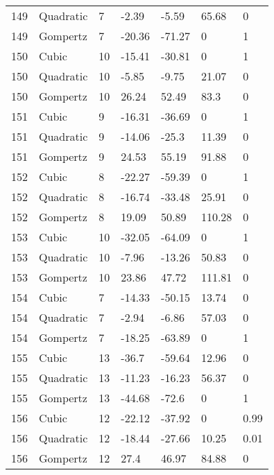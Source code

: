 \documentclass[11pt]{article}
\begin{document}
\begin{center}
\begin{longtable}{lllllll}
    149 & Quadratic & 7               & -2.39   & -5.59   & 65.68   & 0    \\
    149 & Gompertz  & 7               & -20.36  & -71.27  & 0       & 1    \\
    150 & Cubic     & 10              & -15.41  & -30.81  & 0       & 1    \\
    150 & Quadratic & 10              & -5.85   & -9.75   & 21.07   & 0    \\
    150 & Gompertz  & 10              & 26.24   & 52.49   & 83.3    & 0    \\
    151 & Cubic     & 9               & -16.31  & -36.69  & 0       & 1    \\
    151 & Quadratic & 9               & -14.06  & -25.3   & 11.39   & 0    \\
    151 & Gompertz  & 9               & 24.53   & 55.19   & 91.88   & 0    \\
    152 & Cubic     & 8               & -22.27  & -59.39  & 0       & 1    \\
    152 & Quadratic & 8               & -16.74  & -33.48  & 25.91   & 0    \\
    152 & Gompertz  & 8               & 19.09   & 50.89   & 110.28  & 0    \\
    153 & Cubic     & 10              & -32.05  & -64.09  & 0       & 1    \\
    153 & Quadratic & 10              & -7.96   & -13.26  & 50.83   & 0    \\
    153 & Gompertz  & 10              & 23.86   & 47.72   & 111.81  & 0    \\
    154 & Cubic     & 7               & -14.33  & -50.15  & 13.74   & 0    \\
    154 & Quadratic & 7               & -2.94   & -6.86   & 57.03   & 0    \\
    154 & Gompertz  & 7               & -18.25  & -63.89  & 0       & 1    \\
    155 & Cubic     & 13              & -36.7   & -59.64  & 12.96   & 0    \\
    155 & Quadratic & 13              & -11.23  & -16.23  & 56.37   & 0    \\
    155 & Gompertz  & 13              & -44.68  & -72.6   & 0       & 1    \\
    156 & Cubic     & 12              & -22.12  & -37.92  & 0       & 0.99 \\
    156 & Quadratic & 12              & -18.44  & -27.66  & 10.25   & 0.01 \\
    156 & Gompertz  & 12              & 27.4    & 46.97   & 84.88   & 0    \\

\end{longtable}
\end{center}
\end{document}
